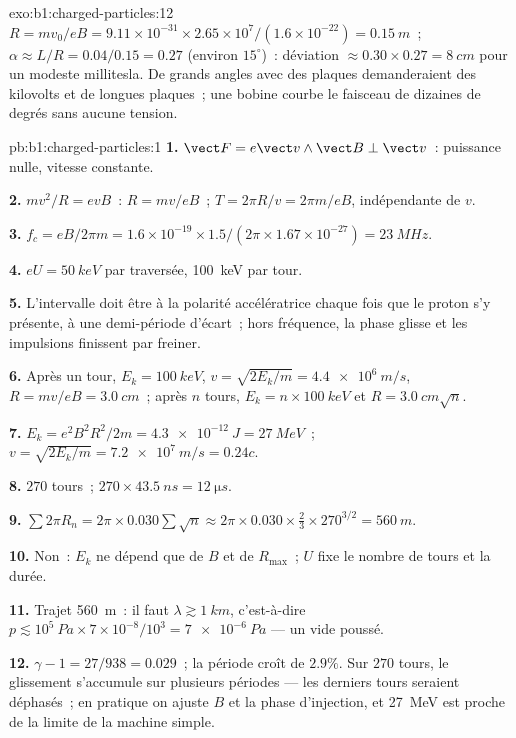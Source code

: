 \begin{solution}{exo:b1:charged-particles:12}
$R = mv_0/eB = 9.11\times10^{-31} \times 2.65\times10^7/(1.6\times10^{-22}) =
\qty{0.15}{m}$~; $\alpha \approx L/R = 0.04/0.15 = 0.27$ (environ $15^\circ$)~:
déviation $\approx 0.30 \times 0.27 = \qty{8}{cm}$ pour un modeste
millitesla. De grands angles avec des plaques demanderaient des
kilovolts et de longues plaques~; une bobine courbe le faisceau de
dizaines de degrés sans aucune tension.
\end{solution}

\begin{solution}{pb:b1:charged-particles:1}
\textbf{1.} $\vect F = e\vect v\wedge\vect B \perp \vect v$~: puissance nulle,
vitesse constante.

\textbf{2.} $mv^2/R = evB$~: $R = mv/eB$~; $T = 2\pi R/v = 2\pi m/eB$,
indépendante de $v$.

\textbf{3.} $f_c = eB/2\pi m = 1.6\times10^{-19} \times 1.5/(2\pi \times 1.67
\times10^{-27}) = \qty{23}{MHz}$.

\textbf{4.} $eU = \qty{50}{keV}$ par traversée, \qty{100}{keV} par tour.

\textbf{5.} L'intervalle doit être à la polarité accélératrice chaque
fois que le proton s'y présente, à une demi-période d'écart~; hors
fréquence, la phase glisse et les impulsions finissent par freiner.

\textbf{6.} Après un tour, $E_k = \qty{100}{keV}$, $v = \sqrt{2E_k/m} =
\qty{4.4e6}{m/s}$, $R = mv/eB = \qty{3.0}{cm}$~; après $n$ tours, $E_k =
n \times \qty{100}{keV}$ et $R = \qty{3.0}{cm}\sqrt n$.

\textbf{7.} $E_k = e^2B^2R^2/2m = \qty{4.3e-12}{J} = \qty{27}{MeV}$~; $v =
\sqrt{2E_k/m} = \qty{7.2e7}{m/s} = 0.24c$.

\textbf{8.} $270$ tours~; $270 \times \qty{43.5}{ns} = \qty{12}{\micro s}$.

\textbf{9.} $\sum 2\pi R_n = 2\pi \times 0.030\sum\sqrt n \approx 2\pi \times 0.030
\times \tfrac23 \times 270^{3/2} = \qty{560}{m}$.

\textbf{10.} Non~: $E_k$ ne dépend que de $B$ et de $R_{\max}$~; $U$ fixe
le nombre de tours et la durée.

\textbf{11.} Trajet \qty{560}{m}~: il faut $\lambda \gtrsim \qty{1}{km}$, c'est-à-dire
$p \lesssim 10^5\ \unit{Pa} \times 7\times10^{-8}/10^3 = \qty{7e-6}{Pa}$ ---
un vide poussé.

\textbf{12.} $\gamma - 1 = 27/938 = 0.029$~; la période croît de $2.9\%$.
Sur $270$ tours, le glissement s'accumule sur plusieurs périodes --- les
derniers tours seraient déphasés~; en pratique on ajuste $B$ et la phase
d'injection, et \qty{27}{MeV} est proche de la limite de la machine simple.


\end{solution}
